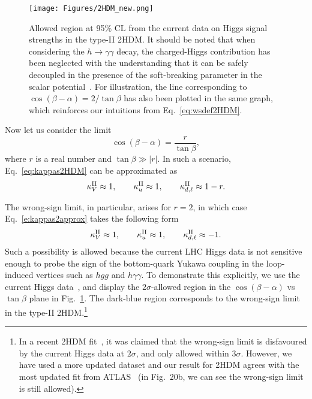 \documentclass[11pt]{article}
\begin{document}
%
\begin{figure}
	\centering
	\texttt{[image: Figures/2HDM\_new.png]}
	\caption{\label{fig:WS2HDM}
		Allowed region at 95\% CL from the current data on Higgs signal strengths in the type-II 2HDM.  
		It should be noted that when considering the $h\to\gamma\gamma$ decay, the charged-Higgs contribution has been neglected with the understanding that it can be safely decoupled in the presence of the soft-breaking parameter in the scalar potential~\cite{Bhattacharyya:2014oka, Carrolo:2021euy,Faro:2020qyp}.  
		For illustration, the line corresponding to \mbox{$\cos(\beta-\alpha)=2/\!\tan\beta$} has also been plotted in the same graph, which reinforces our intuitions from Eq.~\eqref{eq:wsdef2HDM}.  }
\end{figure}
%

%
Now let us consider the limit 
%
\begin{equation}
\label{eq:wsdef2HDM}
\cos\left(\beta-\alpha\right) = \dfrac{r}{\tan\beta},
\end{equation} 
%
where $r$ is a real number and $\tan\beta \gg \lvert r \rvert$.  
In such a scenario, Eq.~\eqref{eq:kappas2HDM} can be approximated as
\begin{eqnarray}
\label{e:kappas2approx}
\kappa_V^{\rm II} \approx  1, \qquad
\kappa_u^{\rm II} \approx 1, \qquad
\kappa_{d,\ell}^{\rm II} \approx 1-r.
\end{eqnarray}
%

The wrong-sign limit, in particular, arises for $r=2$, in which case Eq.~\eqref{e:kappas2approx} takes the following form
\begin{eqnarray}
\label{e:WS2hdm}
\kappa_V^{\rm II} \approx  1, \qquad
\kappa_u^{\rm II} \approx 1, \qquad
\kappa_{d,\ell}^{\rm II} \approx -1.
\end{eqnarray}
%
Such a possibility is allowed because the current LHC Higgs data is not sensitive enough to probe the sign of the bottom-quark Yukawa coupling in the loop-induced vertices such as $hgg$ and $h\gamma\gamma$.  
To demonstrate this explicitly, we use the current Higgs data~\cite{ATLAS:2021vrm}, and display the $2\sigma$-allowed region in the $\cos\left(\beta-\alpha\right)$ vs $\tan\beta$ plane in Fig.~\ref{fig:WS2HDM}.  
The dark-blue region corresponds to the wrong-sign limit in the type-II 2HDM.\footnote{In a recent 2HDM fit~\cite{Atkinson:2021eox}, it was claimed that the wrong-sign limit is disfavoured by the current Higgs data at $2\sigma$, and only allowed within $3\sigma$.  
However, we have used a more updated dataset and our result for 2HDM agrees with the most updated fit from ATLAS~\cite{ATLAS:2021vrm} (in Fig.~20b, we can see the wrong-sign limit is still allowed).}  
\end{document}
